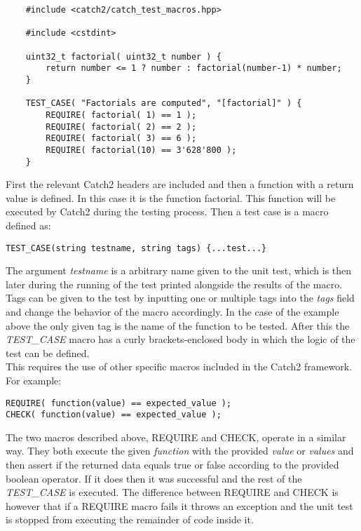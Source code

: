 \begin{verbatim}
    #include <catch2/catch_test_macros.hpp>

    #include <cstdint>
    
    uint32_t factorial( uint32_t number ) {
        return number <= 1 ? number : factorial(number-1) * number;
    }
    
    TEST_CASE( "Factorials are computed", "[factorial]" ) {
        REQUIRE( factorial( 1) == 1 );
        REQUIRE( factorial( 2) == 2 );
        REQUIRE( factorial( 3) == 6 );
        REQUIRE( factorial(10) == 3'628'800 );
    }
\end{verbatim}

First the relevant Catch2 headers are included and then a function with a return value is defined. In this case it is the function factorial. 
This function will be executed by Catch2 during the testing process. Then a test case is a macro defined as:

\begin{verbatim}
TEST_CASE(string testname, string tags) {...test...}
\end{verbatim}

The argument \textit{testname} is a arbitrary name given to the unit test, which is then later during the running of the test printed alongside the results of the macro.
Tags can be given to the test by inputting one or multiple tags into the \textit{tags} field and change the behavior of the macro accordingly. In the case of the example above
the only given tag is the name of the function to be tested. After this the \textit{TEST\_CASE} macro has a curly brackets-enclosed body in which the logic of the test can 
be defined.\\
This requires the use of other specific macros included in the Catch2 framework. For example:

\begin{verbatim}
REQUIRE( function(value) == expected_value );
CHECK( function(value) == expected_value );
\end{verbatim}

The two macros described above, REQUIRE and CHECK, operate in a similar way. They both execute the given \textit{function} with the provided \textit{value} or \textit{values}
and then assert if the returned data equals true or false according to the provided boolean operator. If it does then it was successful and the rest of the \textit{TEST\_CASE} is executed. The difference 
between REQUIRE and CHECK is however that if a REQUIRE macro fails it throws an exception and the unit test is stopped from executing the remainder of code inside it.

